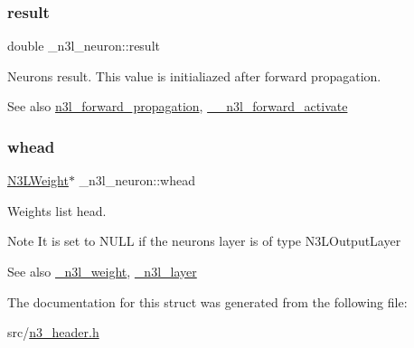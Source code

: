 \subsubsection{\texorpdfstring{result}{result}}
{\footnotesize\ttfamily double \+\_\+n3l\+\_\+neuron\+::result}

Neuron\textquotesingle{}s result. This value is initialiazed after forward propagation.

\begin{DoxySeeAlso}{See also}
\hyperlink{n3__forward_8c_abc37ac7f137db4d053e3b19ac8e6542a}{n3l\+\_\+forward\+\_\+propagation}, \hyperlink{n3__forward_8c_af014464aaf6842d7da0ee6d1b1570ffe}{\+\_\+\+\_\+n3l\+\_\+forward\+\_\+activate} 
\end{DoxySeeAlso}
\mbox{\label{struct__n3l__neuron_ac9259a513822ea957c03430988adfa6a}} 
\subsubsection{\texorpdfstring{whead}{whead}}
{\footnotesize\ttfamily \hyperlink{n3__header_8h_ac37c67a24ec253f5cd205cbc981922ca}{N3\+L\+Weight}$\ast$ \+\_\+n3l\+\_\+neuron\+::whead}

Weight\textquotesingle{}s list head. \begin{DoxyNote}{Note}
It is set to N\+U\+LL if the neuron\textquotesingle{}s layer is of type N3\+L\+Output\+Layer
\end{DoxyNote}
\begin{DoxySeeAlso}{See also}
\hyperlink{struct__n3l__weight}{\+\_\+n3l\+\_\+weight}, \hyperlink{struct__n3l__layer}{\+\_\+n3l\+\_\+layer} 
\end{DoxySeeAlso}


The documentation for this struct was generated from the following file\+:\begin{DoxyCompactItemize}
\item 
src/\hyperlink{n3__header_8h}{n3\+\_\+header.\+h}\end{DoxyCompactItemize}
